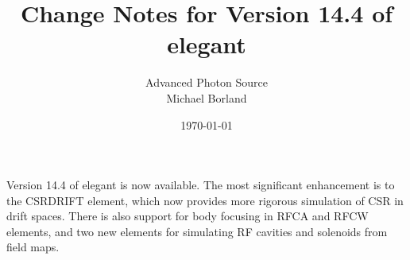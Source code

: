 \pagestyle{plain}
\newenvironment{req}{\begin{equation} \rm}{\end{equation}}
\setlength{\topmargin}{0.15 in}
\setlength{\oddsidemargin}{0 in}
\setlength{\evensidemargin}{0 in} %
\setlength{\textwidth}{6.5 in}
\setlength{\headheight}{-0.5 in} %
\setlength{\footheight}{0 in}
\setlength{\textheight}{9 in}


\title{Change Notes for Version 14.4 of elegant}
\author{Advanced Photon Source\\Michael Borland\\ \date{\today}}
\maketitle

Version 14.4 of elegant is now available.  The most significant
enhancement is to the CSRDRIFT element, which now provides more
rigorous simulation of CSR in drift spaces.  There is also support for
body focusing in RFCA and RFCW elements, and two new elements for
simulating RF cavities and solenoids from field maps.

